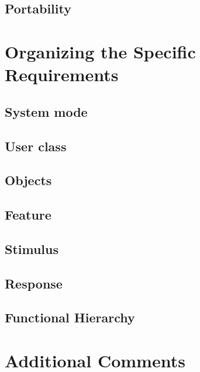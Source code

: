 \subsection{Portability}

\section{Organizing the Specific Requirements}

\subsection{System mode}

\subsection{User class}

\subsection{Objects}

\subsection{Feature}

\subsection{Stimulus}

\subsection{Response}

\subsection{Functional Hierarchy}

\section{Additional Comments}